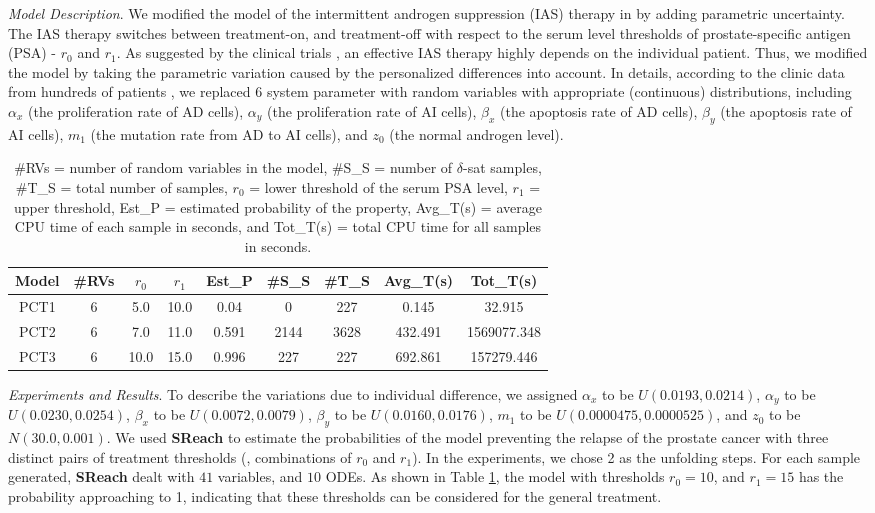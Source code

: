 \textit{Model Description}.
We modified the model of the intermittent androgen suppression (IAS) therapy in \cite{tanaka2010mathematical} by adding parametric uncertainty. The IAS therapy switches between  treatment-on, and treatment-off with respect to the serum level thresholds of prostate-specific antigen (PSA) - $r_0$ and $r_1$. As suggested by the clinical trials \cite{bruchovsky2006final}, an effective IAS therapy highly depends on the individual patient. Thus, we modified the model by taking the parametric variation caused by the personalized differences into account. In details, according to the clinic data from hundreds of patients \cite{bruchovsky2007locally}, we replaced 6 system parameter with random variables with appropriate (continuous) distributions, including $\alpha_x$ (the proliferation rate of AD cells), $\alpha_y$ (the proliferation rate of AI cells), $\beta_x$ (the apoptosis rate of AD cells), $\beta_y$ (the apoptosis rate of AI cells), $m_1$ (the mutation rate from AD to AI cells), and $z_0$ (the normal androgen level).
\begin{table}[h]
\centering
    \begin{tabular}{c|c|c|c|c|c|c|c|c}
    \hline
    Model & \#RVs & $r_0$ & $r_1$ & Est\_P & \#S\_S & \#T\_S & Avg\_T(s) & Tot\_T(s) \\ \hline
    PCT1  & 6     & 5.0  & 10.0 & 0.04   & 0      & 227    & 0.145   & 32.915     \\ \hline
    PCT2  & 6     & 7.0  & 11.0 & 0.591  & 2144   & 3628   & 432.491 & 1569077.348     \\ \hline
    PCT3  & 6     & 10.0 & 15.0 & 0.996  & 227    & 227    & 692.861   & 157279.446   \\ \hline
    \end{tabular}
    \caption {\#RVs = number of random variables in the model, \#S\_S = number of $\delta$-sat samples, 
\#T\_S = total number of samples, $r_0$ = lower threshold of the serum PSA level, $r_1$ = upper threshold, 
Est\_P = estimated probability of the property,  Avg\_T(s) = average CPU time of each sample in seconds, and Tot\_T(s) = total CPU time for all samples in seconds.}
    \label{table:prostate}
\end{table}

\textit{Experiments and Results}. To describe the variations due to individual difference, we assigned $\alpha_x$ to be $U(0.0193, 0.0214)$, $\alpha_y$ to be $U(0.0230, 0.0254)$, $\beta_x$ to be $U(0.0072, 0.0079)$, $\beta_y$ to be $U(0.0160, 0.0176)$, $m_1$ to be $U(0.0000475, 0.0000525) $, and $z_0$ to be $N(30.0, 0.001)$. 
We used {\bf SReach} to estimate the probabilities of the model preventing the relapse of the prostate cancer with three distinct pairs of treatment thresholds (\ie, combinations of $r_0$ and $r_1$).  In the experiments, we chose 2 as the unfolding steps. For each sample generated, {\bf SReach} dealt with $41$ variables, and $10$ ODEs. As shown in Table \ref{table:prostate}, the model with thresholds $r_0 = 10$, and $r_1 = 15$ has the probability approaching to 1, indicating that these thresholds can be considered for the general treatment. 


